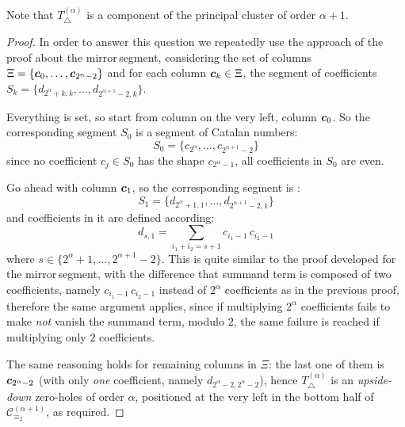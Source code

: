 Note that $T_{\bigtriangleup}^{({\alpha})}$ is a component of the principal cluster
    of order ${\alpha}+1$.

\begin{proof}
In order to answer this question we repeatedly use the approach
of the proof about the \flqq mirror\frqq\,segment, considering the set of columns 
$\Xi=\lbrace \boldsymbol{c}_{0},\ldots, \boldsymbol{c}_{2^{{\alpha}}-2}\rbrace$ and
for each column $\boldsymbol{c}_{k}\in\Xi$, the segment of coefficients
    $S_{k}=\lbrace d_{2^{{\alpha}}+k,k},\ldots,d_{2^{{\alpha}+1}-2,k} \rbrace$.

Everything is set, so start from column on the very left, column $\boldsymbol{c}_{0}$.
So the corresponding segment $S_{0}$ is
a segment of Catalan numbers:
\begin{displaymath}
 S_{0}=\lbrace c_{2^{{\alpha}}}, \ldots, c_{2^{{\alpha}+1}-2}\rbrace
\end{displaymath}
since no coefficient $c_{j}\in S_{0}$ has the shape $c_{2^{\alpha}-1}$, 
all coefficients in $S_{0}$ are even.

Go ahead with column $\boldsymbol{c}_{1}$, so the corresponding segment is :
\begin{displaymath}
    S_{1}=\lbrace d_{2^{{\alpha}}+1,1},\ldots,d_{2^{{\alpha}+1}-2,1} \rbrace
\end{displaymath}
and coefficients in it are defined according:
\begin{displaymath}
    d_{s, 1} = \sum_{i_{1}+i_{2}=s+1} {c_{i_{1}-1}\,c_{i_{2}-1}}
\end{displaymath}
where $s\in \lbrace2^{{\alpha}}+1,\ldots,2^{{\alpha}+1}-2\rbrace$. 
This is quite similar to the proof developed for the \flqq mirror\frqq\,segment,
with the difference that summand term is composed of two coefficients, namely
$c_{i_{1}-1}\,c_{i_{2}-1}$ instead of $2^{{\alpha}}$ coefficients as in the previous proof, 
therefore the same argument applies,
since if multiplying $2^{{\alpha}}$ coefficients fails to make \emph{not} vanish
the summand term, modulo $2$, the same failure is reached if multiplying only $2$ coefficients.

The same reasoning holds for remaining columns in $\Xi$: the last one of them is 
$\boldsymbol{c}_{2^{\alpha}-2}$ (with only \emph{one} coefficient, namely $d_{2^{\alpha}-2,2^{\alpha}-2}$), 
hence $T_{\bigtriangleup}^{({\alpha})}$ is an \emph{upside-down} zero-holes of order $\alpha$,
positioned at the very left in the bottom half of $\mathcal{C}_{\equiv_{2}}^{(\alpha+1)}$, as required.

\end{proof}

